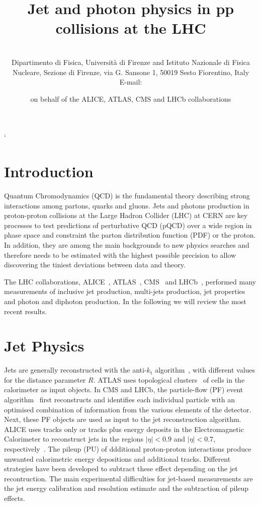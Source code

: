 \documentclass{PoS}
\title{Jet and photon physics in pp collisions at the LHC}
\author{\speaker{ Vitaliano Ciulli } %
\\ Dipartimento di Fisica, Universit\`a di Firenze and Istituto
Nazionale di Fisica Nucleare, Sezione di Firenze, via G. Sansone 1, 50019 Sesto Fiorentino, Italy \\ E-mail:
\email{vitaliano.ciulli@fi.infn.it}} \author{on behalf of the ALICE, ATLAS, CMS and LHCb collaborations}
\providecommand{\kts}{\ensuremath{k_{\mathrm{t}}}\xspace}
\begin{document}
`
\section{Introduction}

Quantum Chromodynamics (QCD) is the fundamental theory describing strong interactions among partons, \ie quarks and
gluons. Jets and photons production in proton-proton collisions at the Large Hadron Collider (LHC) at CERN are key processes to test predictions of
perturbative QCD (pQCD) over a wide region in phase space and constraint the parton distribution function (PDF) or the
proton. In addition, they are among the main backgrounds to new physics searches and therefore needs to be estimated with the
highest possible precision to allow discovering the tiniest deviations between data and theory.

The LHC collaborations, ALICE~\cite{Aamodt:2008zz}, ATLAS~\cite{Aad:2008zzm}, CMS~\cite{Chatrchyan:2008aa} and LHCb~\cite{Alves:2008zz}, performed many
measurements of inclusive jet production, multi-jets production, jet properties and photon and diphoton production. 
In the following we will review the most recent results.

\section{Jet Physics}

Jets are generally reconstructed with the anti-\kts algorithm~\cite{Cacciari:2008gp}, with different values for the distance parameter $R$.
ATLAS uses topological clusters~\cite{Lampl:2008zz} of cells in the calorimeter as input objects. 
In CMS and LHCb, the particle-flow (PF) event
algorithm~\cite{CMS:2009nxa,Aaij:2013nxa} first reconstructs and identifies each individual particle with an optimised
combination of information from the various elements of the detector. Next, these PF objects are used as input to the jet
reconstruction algorithm. ALICE uses tracks only or tracks plus energy deposits
in the Electromagnetic Calorimeter to reconstruct jets in the regions
$|\eta|<0.9$ and $|\eta|<0.7$, respectively~\cite{Abelev:2013fn}.
The pileup (PU) of ddditional proton-proton interactions produce unwanted calorimetric energy depositions and additional
tracks. Different strategies have been developed to subtract these effect depending on the jet recontruction.
The main experimental difficulties for jet-based measurements are the jet energy calibration and resolution estimate and the subtraction of pileup
effects. 
\end{document}
